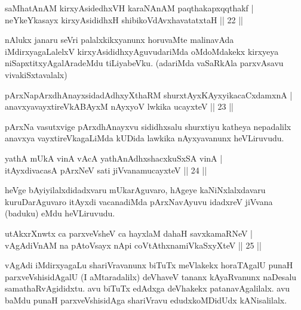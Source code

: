 \begin{shl}
saMhatAnAM kirxyAsidedhxVH karaNAnAM paqthakapxqqthakf | \\
neYkeYkasayx kirxyAsididhxH shibikoVdAvxhavatatxtaH \hfill|| 22 || 
\end{shl}

\begin{artha}
nAlukx janaru seVri palalxkikxyanunx horuvaMte malinavAda 
iMdirxyagaLalelxV kirxyAsididhxyAguvudariMda oMdoMdakekx kirxyeya 
niSapxtitxyAgalAradeMdu tiLiyabeVku. (adariMda vaSaRkAla parxvAsavu 
vivakiSxtavalalx)
\end{artha}

\begin{shl}
pArxNapArxdhAnayxsidadAdhxyXthaRM shurxtAyx\s \s KAyxyikacaCxdamxnA | \\
anavxyavayxtireVkABAyxM nAyxyoV lwkika ucayxteV \hfill|| 23 || 
\end{shl}

\begin{artha}
pArxNa vasutxvige pArxdhAnayxvu sididhxsalu shurxtiyu katheya nepadalilx anavxya vayxtireVkagaLiMda kUDida lawkika nAyxyavanunx heVLiruvudu.
\end{artha}


\begin{shl}
yathA mUkA vinA vAcA yathA\s nAdhxshacxkuSxSA vinA | \\
itAyxdivacasA pArxNeV sati jiVvanamucayxteV \hfill|| 24 || 
\end{shl}

\begin{artha}
heVge bAyiyilalxdidadxvaru mUkarAguvaro, hAgeye kaNiNxlalxdavaru kuruDarAguvaro itAyxdi vacanadiMda pArxNavAyuvu idadxreV jiVvana (baduku) eMdu heVLiruvudu.
\end{artha}

\begin{shl}
utAkxrXnwtx ca parxveVsheV ca hayxlaM dahaH savxkamaRNeV | \\
vAgAdiVnAM na pAtoV\s sayx nApi coVtAthxnamiVkaSxyXteV \hfill|| 25 || 
\end{shl}

\begin{artha}
vAgAdi iMdirxyagaLu shariVravanunx biTuTx meVlakekx horaTAgalU punaH parxveVshisidAgalU (I aMtaradalilx) deVhaveV tananx kAyaRvanunx naDesalu samathaRvAgididxtu. avu biTuTx edAdxga deVhakekx patanavAgalilalx. avu baMdu punaH parxveVshisidAga shariVravu edudxkoMDidUdx kANisalilalx.
\end{artha}

